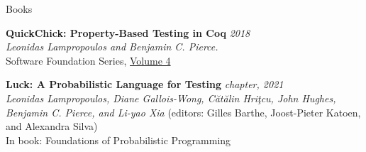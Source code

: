 \documentclass{resume} %
\begin{document}
\begin{rSection}{Books}

  {\bf QuickChick: Property-Based Testing in Coq} \hfill {\em 2018}\\
  {\em Leonidas Lampropoulos and Benjamin C. Pierce.}\\
  {Software Foundation Series, \href{https://softwarefoundations.cis.upenn.edu}{Volume 4}}

  {\bf Luck: A Probabilistic Language for Testing} \hfill {\em chapter, 2021}\\
  {\em Leonidas Lampropoulos, Diane Gallois-Wong, C\u{a}t\u{a}lin Hri\c{t}cu, John Hughes, Benjamin C. Pierce, and Li-yao Xia} {(editors: Gilles Barthe, Joost-Pieter Katoen, and Alexandra Silva)}\\
  In book: {Foundations of Probabilistic Programming} \\

  
\end{rSection}
\end{document}

